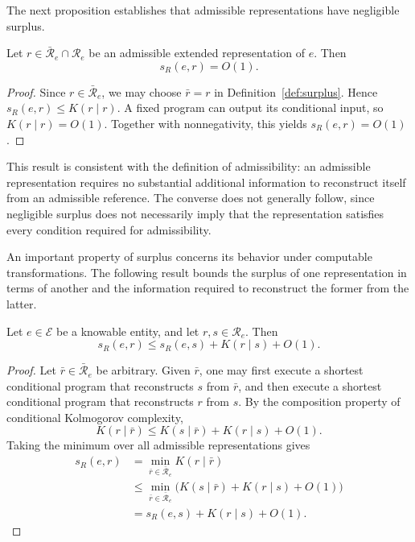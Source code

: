 The next proposition establishes that admissible representations have negligible surplus.

\begin{proposition}
\label{prop:surplus_admissible}
Let $r\in\bar{\mathcal R}_e\cap\mathcal R_e$ be an admissible extended representation of $e$. Then
\[
s_R(e,r)=O(1).
\]
\end{proposition}
\begin{proof}
Since $r\in\bar{\mathcal R}_e$, we may choose $\bar r=r$ in Definition~\ref{def:surplus}. Hence $s_R(e,r)\le K(r\mid r)$. A fixed program can output its conditional input, so $K(r\mid r)=O(1)$. Together with nonnegativity, this yields $s_R(e,r)=O(1)$.
\end{proof}

This result is consistent with the definition of admissibility: an admissible representation requires no substantial additional information to reconstruct itself from an admissible reference. The converse does not generally follow, since negligible surplus does not necessarily imply that the representation satisfies every condition required for admissibility.

An important property of surplus concerns its behavior under computable transformations. The following result bounds the surplus of one representation in terms of another and the information required to reconstruct the former from the latter.

\begin{proposition}
\label{prop:surplus_triangle}
Let $e\in\mathcal E$ be a knowable entity, and let $r,s\in\mathcal R_e$. Then
\[
s_R(e,r) \le s_R(e,s) + K(r\mid s) + O(1).
\]
\end{proposition}
\begin{proof}
Let $\bar r\in\bar{\mathcal R}_e$ be arbitrary. Given $\bar r$, one may first execute a shortest conditional program that reconstructs $s$ from $\bar r$, and then execute a shortest conditional program that reconstructs $r$ from $s$. By the composition property of conditional Kolmogorov complexity,
\[
K(r\mid\bar r) \le K(s\mid\bar r)+K(r\mid s)+O(1).
\]
Taking the minimum over all admissible representations gives
\[
\begin{aligned}
s_R(e,r)
& = \min_{\bar r\in\bar{\mathcal R}_e} K(r\mid\bar r)\\
& \le \min_{\bar r\in\bar{\mathcal R}_e} \bigl(K(s\mid\bar r)+K(r\mid s)+O(1)\bigr)\\
& = s_R(e,s)+K(r\mid s)+O(1).
\end{aligned}
\]
\end{proof}

